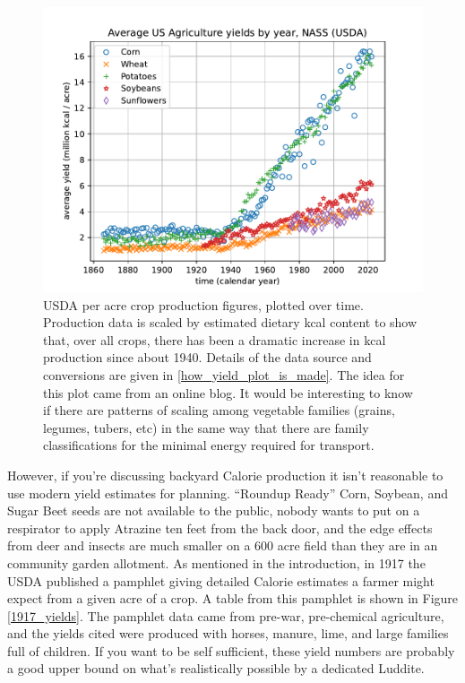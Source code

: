 \documentclass[jou]{apa7}
\begin{document}
\begin{figure}[ht!]
\centering
\includegraphics[width=\columnwidth]{kcal_per_acre_yields.pdf}
\caption{
USDA per acre crop production figures, plotted over time.  Production data is scaled by estimated dietary kcal content to show that, over all crops, there has been a dramatic increase in kcal production since about 1940.  
Details of the data source and conversions are given in \ref{how_yield_plot_is_made}.
The idea for this plot came from an online blog.\cite{math_encounters}  
It would be interesting to know if there are patterns of scaling among vegetable families (grains, legumes, tubers, etc) in the same way that there are family classifications for the minimal energy required for transport. \cite{energetic_cost_of_moving}
}
\label{ag_yields}
\end{figure}

However, if you're discussing backyard Calorie production it isn't reasonable to use modern yield estimates for planning.  ``Roundup Ready'' Corn, Soybean, and Sugar Beet seeds are not available to the public, nobody wants to put on a respirator to apply Atrazine ten feet from the back door,  and the edge effects from deer and insects are much smaller on a $600$ acre field than they are in an community garden allotment.  As mentioned in the introduction, in 1917 the USDA published a pamphlet\cite{USDA_1917_yields_pamphlet} giving detailed Calorie estimates a farmer might expect from a given acre of a crop.  A table from this pamphlet is shown in Figure \ref{1917_yields}.  
The pamphlet data came from pre-war, pre-chemical agriculture, and the yields cited were produced with horses, manure, lime, and large families full of children.  If you want to be self sufficient, these yield numbers are probably a good upper bound on what's realistically possible by a dedicated Luddite.  
\end{document}
